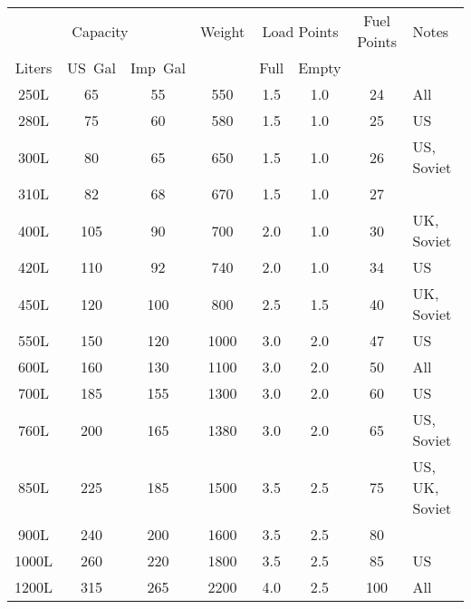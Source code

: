 \begin{twocolumntablefloat}
\begin{twocolumntable}
{
\begin{tabular}{cccccccl}
\toprule
\multicolumn{3}{c}{Capacity}&
Weight&
\multicolumn{2}{c}{Load Points}&
Fuel Points&
Notes\\
\cmidrule{1-3}
\cmidrule{5-6}
Liters&US~Gal&Imp~Gal&&Full&Empty&&\\
\midrule
\phantom{00}250L&\phantom{00}65&\phantom{00}55&\phantom{00}550&\phantom{0}1.5&\phantom{0}1.0&\phantom{0}24&All\\
\phantom{00}280L&\phantom{00}75&\phantom{00}60&\phantom{00}580&\phantom{0}1.5&\phantom{0}1.0&\phantom{0}25&US\\
\phantom{00}300L&\phantom{00}80&\phantom{00}65&\phantom{00}650&\phantom{0}1.5&\phantom{0}1.0&\phantom{0}26&US, Soviet\\
\phantom{00}310L&\phantom{00}82&\phantom{00}68&\phantom{00}670&\phantom{0}1.5&\phantom{0}1.0&\phantom{0}27&\\
\phantom{00}400L&\phantom{0}105&\phantom{00}90&\phantom{00}700&\phantom{0}2.0&\phantom{0}1.0&\phantom{0}30&UK, Soviet\\
\phantom{00}420L&\phantom{0}110&\phantom{00}92&\phantom{00}740&\phantom{0}2.0&\phantom{0}1.0&\phantom{0}34&US\\
\phantom{00}450L&\phantom{0}120&\phantom{0}100&\phantom{00}800&\phantom{0}2.5&\phantom{0}1.5&\phantom{0}40&UK, Soviet\\
\phantom{00}550L&\phantom{0}150&\phantom{0}120&\phantom{0}1000&\phantom{0}3.0&\phantom{0}2.0&\phantom{0}47&US\\
\phantom{00}600L&\phantom{0}160&\phantom{0}130&\phantom{0}1100&\phantom{0}3.0&\phantom{0}2.0&\phantom{0}50&All\\
\phantom{00}700L&\phantom{0}185&\phantom{0}155&\phantom{0}1300&\phantom{0}3.0&\phantom{0}2.0&\phantom{0}60&US\\
\phantom{00}760L&\phantom{0}200&\phantom{0}165&\phantom{0}1380&\phantom{0}3.0&\phantom{0}2.0&\phantom{0}65&US, Soviet\\
\phantom{00}850L&\phantom{0}225&\phantom{0}185&\phantom{0}1500&\phantom{0}3.5&\phantom{0}2.5&\phantom{0}75&US, UK, Soviet\\
\phantom{00}900L&\phantom{0}240&\phantom{0}200&\phantom{0}1600&\phantom{0}3.5&\phantom{0}2.5&\phantom{0}80&\\
\phantom{0}1000L&\phantom{0}260&\phantom{0}220&\phantom{0}1800&\phantom{0}3.5&\phantom{0}2.5&\phantom{0}85&US\\
\phantom{0}1200L&\phantom{0}315&\phantom{0}265&\phantom{0}2200&\phantom{0}4.0&\phantom{0}2.5&\phantom{}100&All\\

\end{tabular}}
\end{twocolumntable}
\end{twocolumntablefloat}
